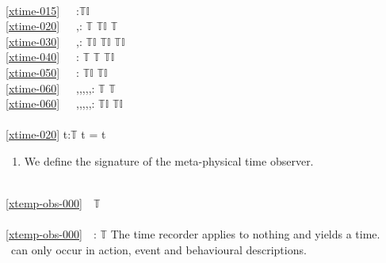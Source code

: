 \\
\ref{xtime-015}\ \ \ :$\mathbb{TI}$\\
\ref{xtime-020}\ \ \ {\PLUS},{\MINUS}: $\mathbb{T}$ {\TIMES} $\mathbb{TI}$ {\RIGHTARROW} $\mathbb{T}$\\
\ref{xtime-030}\ \ \ {\PLUS},{\MINUS}: $\mathbb{TI}$ {\TIMES} $\mathbb{TI}$ {\PARRIGHTARROW} $\mathbb{TI}$\\
\ref{xtime-040}\ \ \ {\MINUS}: $\mathbb{T}$ {\TIMES} $\mathbb{T}$ {\RIGHTARROW} $\mathbb{TI}$\\
\ref{xtime-050}\ \ \ {\AST}: $\mathbb{TI}$ {\TIMES}  {\RIGHTARROW} $\mathbb{TI}$\\
\ref{xtime-060}\ \ \ {\LT},{\LEQ},{\EQ},{\NOTEQ},{\GEQ},{\GT}: $\mathbb{T}$ {\TIMES} $\mathbb{T}$ {\RIGHTARROW} \\
\ref{xtime-060}\ \ \ {\LT},{\LEQ},{\EQ},{\NOTEQ},{\GEQ},{\GT}: $\mathbb{TI}$ {\TIMES} $\mathbb{TI}$ {\RIGHTARROW} \\
\\
\ref{xtime-020} {\ALL} t:$\mathbb{T}$ {\RDOT} t{\PLUS} = t
\ep
\pos{\end{multicols}}{}

\begin{enumerate}\setei
\item \label{xtemp-obs-000} We define the signature of the meta-physical time observer.
\savei\end{enumerate}
\bp
{}\\
\ref{xtemp-obs-000}\ \ $\mathbb{T}$\\
\\
\ref{xtemp-obs-000}\ \ \recordtime:  {\RIGHTARROW} $\mathbb{T}$ 
\ep 
\noindent
\begynd
\pind The time recorder applies to nothing and yields a time.
\pind \recordtime\ can only occur in action, event and behavioural descriptions.
\afslut

%

%

